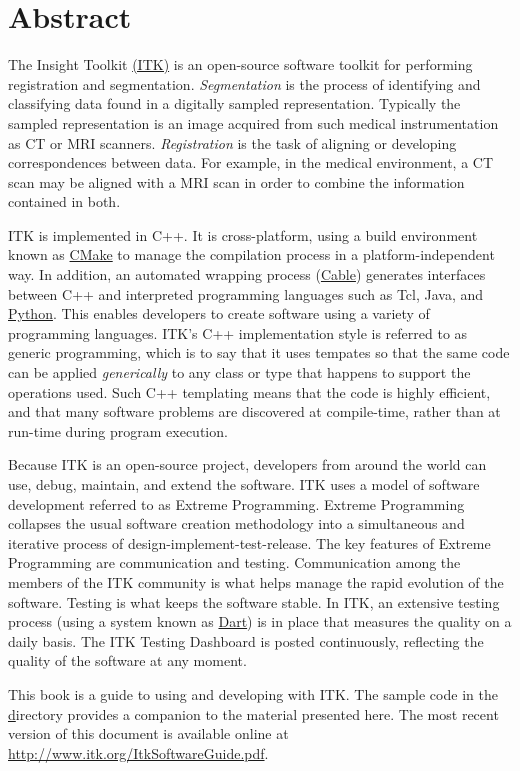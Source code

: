 \chapter*{Abstract}
\noindent
The Insight Toolkit \href{http://www.itk.org}{(ITK)} is an open-source
software toolkit for performing registration and
segmentation. \emph{Segmentation} is the process of identifying and
classifying data found in a digitally sampled
representation. Typically the sampled representation is an image
acquired from such medical instrumentation as CT or MRI
scanners. \emph{Registration} is the task of aligning or developing
correspondences between data. For example, in the medical environment,
a CT scan may be aligned with a MRI scan in order to combine the
information contained in both.

ITK is implemented in C++. It is cross-platform, using a build
environment known as \href{http://www.cmake.org}{CMake} to manage the
compilation process in a platform-independent way. In addition, an
automated wrapping process
(\href{http://public.kitware.com/Cable/HTML/Index.html}{Cable})
generates interfaces between C++ and interpreted programming languages
such as Tcl, Java, and \href{http://www.python.org}{Python}. This
enables developers to create software using a variety of programming
languages. ITK's C++ implementation style is referred to as generic
programming, which is to say that it uses tempates so that the same
code can be applied \emph{generically} to any class or type that
happens to support the operations used. Such C++
templating means that the code is highly efficient, and that many
software problems are discovered at compile-time, rather than at
run-time during program execution.

Because ITK is an open-source project, developers from around the
world can use, debug, maintain, and extend the software. ITK uses a
model of software development referred to as Extreme
Programming. Extreme Programming collapses the usual software creation
methodology into a simultaneous and iterative process of
design-implement-test-release. The key features of Extreme Programming
are communication and testing. Communication among the members of the
ITK community is what helps manage the rapid evolution of the
software.  Testing is what keeps the software stable. In ITK, an
extensive testing process (using a system known as
\href{http://public.kitware.com/dashboard.php}{Dart}) is in place that
measures the quality on a daily basis. The ITK Testing Dashboard is
posted continuously, reflecting the quality of the software at any
moment.

This book is a guide to using and developing with ITK. The sample code
in the
\href{http://www.itk.org/cgi-bin/viewcvs.cgi/Examples/?root=Insight}
directory provides a companion to the material presented here.  The
most recent version of this document is available online at
\url{http://www.itk.org/ItkSoftwareGuide.pdf}.



